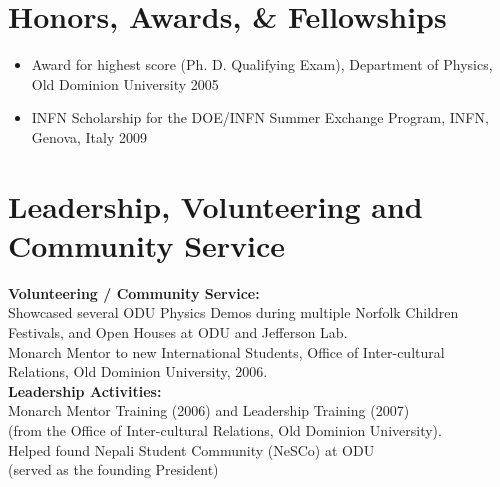 \documentclass[10pt, letterpaper]{article}
\newcommand{\years}[1]{\marginnote{\small #1}} %
\begin{document}
\section*{Honors, Awards, \& Fellowships}
\noindent
\begin{itemize}
\item Award for highest score (Ph. D. Qualifying Exam), Department of Physics, Old Dominion University \hfill 2005
\item INFN Scholarship for the DOE/INFN Summer Exchange Program, INFN, Genova, Italy \hfill 2009 
\end{itemize}




\section*{Leadership, Volunteering and Community Service}
\noindent
  {\bf Volunteering / Community Service: } \\
  Showcased several ODU Physics Demos during multiple Norfolk Children \\
  \hspace*{3 mm} Festivals, and Open Houses at ODU and Jefferson Lab. \\
  Monarch Mentor to new International Students, Office of Inter-cultural \\
  \hspace*{3 mm} Relations, Old Dominion University, 2006.\\
  {\bf Leadership Activities: } \\
  Monarch Mentor Training (2006) and Leadership Training (2007) \\
  \hspace*{3 mm} (from the Office of Inter-cultural Relations, Old Dominion University).\\
  Helped found Nepali Student Community (NeSCo) at ODU \\
  \hspace*{3 mm} (served as the founding President) 
\end{document}

